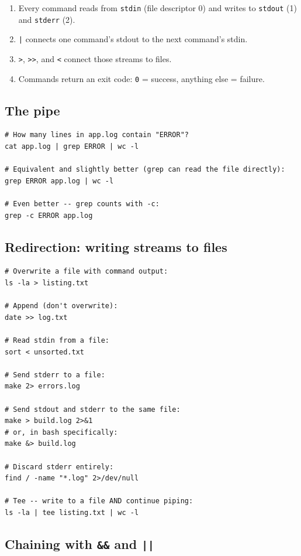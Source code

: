 \documentclass[11pt,a4paper]{article}
\begin{document}
\begin{enumerate}[leftmargin=*]
\item Every command reads from \texttt{stdin} (file descriptor 0)
and writes to \texttt{stdout} (1) and \texttt{stderr} (2).
\item \texttt{|} connects one command's stdout to the next command's stdin.
\item \texttt{>}, \texttt{>>}, and \texttt{<} connect those streams
to files.
\item Commands return an exit code: \texttt{0} = success, anything
else = failure.
\end{enumerate}

\subsection*{The pipe}

\begin{lstlisting}[style=bashstyle]
# How many lines in app.log contain "ERROR"?
cat app.log | grep ERROR | wc -l

# Equivalent and slightly better (grep can read the file directly):
grep ERROR app.log | wc -l

# Even better -- grep counts with -c:
grep -c ERROR app.log
\end{lstlisting}

\subsection*{Redirection: writing streams to files}

\begin{lstlisting}[style=bashstyle]
# Overwrite a file with command output:
ls -la > listing.txt

# Append (don't overwrite):
date >> log.txt

# Read stdin from a file:
sort < unsorted.txt

# Send stderr to a file:
make 2> errors.log

# Send stdout and stderr to the same file:
make > build.log 2>&1
# or, in bash specifically:
make &> build.log

# Discard stderr entirely:
find / -name "*.log" 2>/dev/null

# Tee -- write to a file AND continue piping:
ls -la | tee listing.txt | wc -l
\end{lstlisting}

\subsection*{Chaining with \texttt{\&\&} and \texttt{||}}
\end{document}
